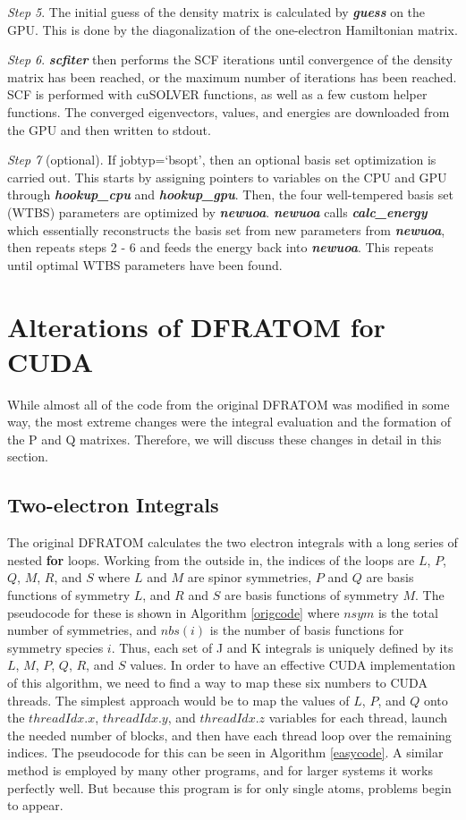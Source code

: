 \textit{Step 5}. The initial guess of the density matrix is calculated by \textit{\textbf{guess}} on the GPU. This is done by the diagonalization of the one-electron Hamiltonian matrix.

\textit{Step 6}. \textit{\textbf{scfiter}} then performs the SCF iterations until convergence of the density matrix has been reached, or the maximum number of iterations has been reached. SCF is performed with cuSOLVER functions, as well as a few custom helper functions. The converged eigenvectors, values, and energies are downloaded from the GPU and then written to stdout.

\textit{Step 7} (optional). If jobtyp=`bsopt', then an optional basis set optimization is carried out. This starts by assigning pointers to variables on the CPU and GPU through \textit{\textbf{hookup\_cpu}} and \textit{\textbf{hookup\_gpu}}. Then, the four well-tempered basis set (WTBS) parameters are optimized by \textit{\textbf{newuoa}}. \textit{\textbf{newuoa}} calls \textit{\textbf{calc\_energy}} which essentially reconstructs the basis set from new parameters from \textit{\textbf{newuoa}}, then repeats steps 2 - 6 and feeds the energy back into \textit{\textbf{newuoa}}. This repeats until optimal WTBS parameters have been found.

\section{Alterations of DFRATOM for CUDA}
While almost all of the code from the original DFRATOM\cite{MATSUOKA2001218} was modified in some way, the most extreme changes were the integral evaluation and the formation of the P and Q matrixes. Therefore, we will discuss these changes in detail in this section.

\subsection{Two-electron Integrals}
The original DFRATOM calculates the two electron integrals with a long series of nested \textbf{for} loops. Working from the outside in, the indices of the loops are $L$, $P$, $Q$, $M$, $R$, and $S$ where $L$ and $M$ are spinor symmetries, $P$ and $Q$ are basis functions of symmetry $L$, and $R$ and $S$ are basis functions of symmetry $M$. The pseudocode for these is shown in Algorithm \ref{origcode} where $nsym$ is the total number of symmetries, and $nbs(i)$ is the number of basis functions for symmetry species $i$. Thus, each set of J and K integrals is uniquely defined by its $L$, $M$, $P$, $Q$, $R$, and $S$ values. In order to have an effective CUDA implementation of this algorithm, we need to find a way to map these six numbers to CUDA threads. The simplest approach would be to map the values of $L$, $P$, and $Q$ onto the $threadIdx.x$, $threadIdx.y$, and $threadIdx.z$ variables for each thread, launch the needed number of blocks, and then have each thread loop over the remaining indices. The pseudocode for this can be seen in Algorithm \ref{easycode}. A similar method is employed by many other programs, and for larger systems it works perfectly well. But because this program is for only single atoms, problems begin to appear.

